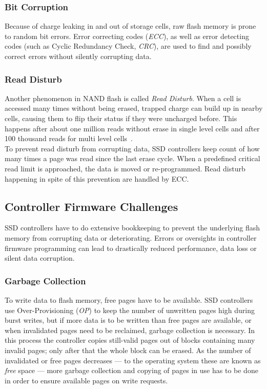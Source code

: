 \documentclass{acm_proc_article-sp}
\begin{document}
\subsubsection*{Bit Corruption}
Because of charge leaking in and out of storage cells, raw flash memory is prone to random bit errors. Error correcting codes (\emph{ECC}), as well as error detecting codes (such as Cyclic Redundancy Check, \emph{CRC}), are used to find and possibly correct errors without silently corrupting data.

\subsubsection*{Read Disturb}
Another phenomenon in NAND flash is called \emph{Read Disturb}. When a cell is accessed many times without being erased, trapped charge can build up in nearby cells, causing them to flip their status if they were uncharged before.
This happens after about one million reads without erase in single level cells and after 100 thousand reads for multi level cells~\cite{cooke2007inconvenient}.
\\
To prevent read disturb from corrupting data, SSD controllers keep count of how many times a page was read since the last erase cycle. When a predefined critical read limit is approached, the data is moved or re-programmed. Read disturb happening in spite of this prevention are handled by ECC.

\subsection{Controller Firmware Challenges}
SSD controllers have to do extensive bookkeeping to prevent the underlying flash memory from corrupting data or deteriorating. Errors or oversights in controller firmware programming can lead to drastically reduced performance, data loss or silent data corruption.

\subsubsection*{Garbage Collection}
To write data to flash memory, free pages have to be available. SSD controllers use Over-Provisioning (\emph{OP}) to keep the number of unwritten pages high during burst writes, but if more data is to be written than free pages are available, or when invalidated pages need to be reclaimed, garbage collection is necessary. In this process the controller copies still-valid pages out of blocks containing many invalid pages; only after that the whole block can be erased. As the number of invalidated or free pages decreases --- to the operating system these are known as \emph{free} space --- more garbage collection and copying of pages in use has to be done in order to ensure available pages on write requests.
\end{document}
